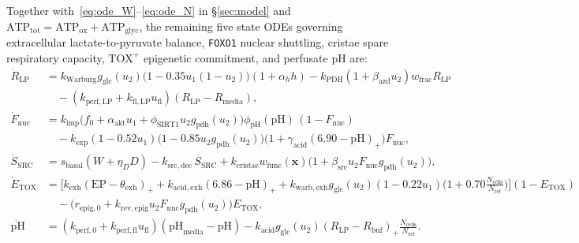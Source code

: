 \documentclass[11pt]{article}
\theoremstyle{plain}
\theoremstyle{remark}
\begin{document}
Together with~\eqref{eq:ode_W}--\eqref{eq:ode_N} in \S\ref{sec:model} and $\mathrm{ATP}_{\mathrm{tot}} = \mathrm{ATP}_{\mathrm{ox}} + \mathrm{ATP}_{\mathrm{glyc}}$, the remaining five state ODEs governing extracellular lactate-to-pyruvate balance, \texttt{FOXO1} nuclear shuttling, cristae spare respiratory capacity, $\text{TOX}^+$ epigenetic commitment, and perfusate $\mathrm{pH}$ are:
\begin{align}
  \dot{R}_{\mathrm{LP}} &= k_{\mathrm{Warburg}} g_{\mathrm{glc}}(u_2)\big(1 - 0.35 u_1(1 - u_2)\big)(1 + \alpha_h h) - k_{\mathrm{PDH}}(1 + \beta_{\mathrm{azd}} u_2)w_{\mathrm{frac}} R_{\mathrm{LP}} \nonumber\\
  &\quad - (k_{\mathrm{perf,LP}} + k_{\mathrm{fl,LP}} u_{\mathrm{fl}})(R_{\mathrm{LP}} - R_{\mathrm{media}}), \label{eq:ode_R} \\
  \dot{F}_{\mathrm{nuc}} &= k_{\mathrm{imp}}\big(f_0 + \alpha_{\mathrm{akt}} u_1 + \phi_{\mathrm{SIRT1}} u_2 g_{\mathrm{pdh}}(u_2)\big)\phi_{\mathrm{pH}}(\mathrm{pH})\,(1 - F_{\mathrm{nuc}}) \nonumber\\
  &\quad - k_{\mathrm{exp}}(1 - 0.52 u_1)\big(1 - 0.85 u_2 g_{\mathrm{pdh}}(u_2)\big)\big(1 + \gamma_{\mathrm{acid}}(6.90 - \mathrm{pH})_+\big)F_{\mathrm{nuc}}, \label{eq:ode_F} \\
  \dot{S}_{\mathrm{SRC}} &= s_{\mathrm{basal}}(W + \eta_D D) - k_{\mathrm{src,dec}}\,S_{\mathrm{SRC}} + k_{\mathrm{cristae}} w_{\mathrm{func}}(\mathbf{x})\big(1 + \beta_{\mathrm{src}} u_2 F_{\mathrm{nuc}} g_{\mathrm{pdh}}(u_2)\big), \label{eq:ode_S} \\
  \dot{E}_{\mathrm{TOX}} &= \Big[k_{\mathrm{exh}}(\mathrm{EP} - \theta_{\mathrm{exh}})_+ + k_{\mathrm{acid,exh}}(6.86 - \mathrm{pH})_+ + k_{\mathrm{warb,exh}} g_{\mathrm{glc}}(u_2)(1 - 0.22 u_1)\Big(1 + 0.70\frac{N_{\mathrm{cells}}}{N_{\mathrm{ref}}}\Big)\Big](1 - E_{\mathrm{TOX}}) \nonumber\\
  &\quad - \big(r_{\mathrm{epig},0} + k_{\mathrm{rev,epig}} u_2 F_{\mathrm{nuc}} g_{\mathrm{pdh}}(u_2)\big)E_{\mathrm{TOX}}, \label{eq:ode_E} \\
  \dot{\mathrm{pH}} &= (k_{\mathrm{perf},0} + k_{\mathrm{perf,fl}} u_{\mathrm{fl}})(\mathrm{pH}_{\mathrm{media}} - \mathrm{pH}) - k_{\mathrm{acid}} g_{\mathrm{glc}}(u_2)(R_{\mathrm{LP}} - R_{\mathrm{buf}})_+\frac{N_{\mathrm{cells}}}{N_{\mathrm{ref}}}. \label{eq:ode_pH}
\end{align}
\end{document}
